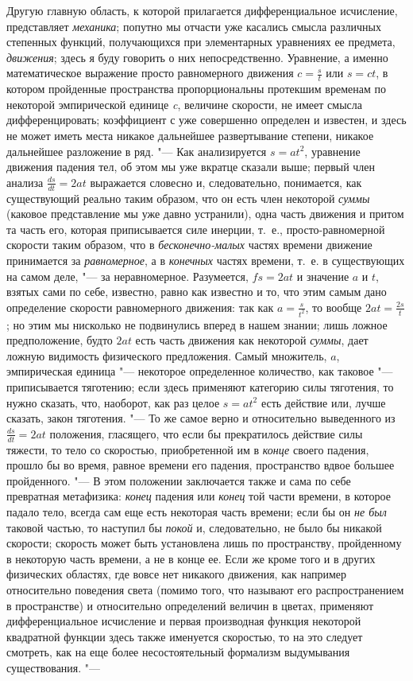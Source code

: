 Другую главную область, к которой прилагается дифференциальное исчисление,
представляет {\em механика}; попутно мы отчасти уже
касались смысла различных степенных функций, получающихся при элементарных
уравнениях ее предмета, {\em движения}; здесь я буду
говорить о них непосредственно. Уравнение, а именно математическое
выражение просто равномерного движения $c=\frac s t$ или $s=ct$,
в котором пройденные пространства пропорциональны протекшим временам по
некоторой эмпирической единице {\em c}, величине
скорости, не имеет смысла дифференцировать; коэффициент с уже совершенно
определен и известен, и здесь не может иметь места никакое дальнейшее
развертывание степени, никакое дальнейшее разложение в ряд. "--- Как
анализируется $s=at^2$, уравнение движения падения тел, об этом мы уже
вкратце сказали выше; первый член анализа
$\frac{ds}{dt}=2at$ выражается словесно и,
следовательно, понимается, как существующий реально таким образом, что он
есть член некоторой {\em суммы} (каковое представление
мы уже давно устранили), одна часть движения и притом та часть его, которая
приписывается силе инерции, т.~е., просто-равномерной скорости таким
образом, что в {\em бесконечно-малых} частях времени
движение принимается за {\em равномерное}, а в
{\em конечных} частях времени, т.~е. в существующих на
самом деле, "--- за неравномерное. Разумеется, $fs=2at$ и
значение $a$ и $t$, взятых
сами по себе, известно, равно как известно и то, что этим самым дано
определение скорости равномерного движения: так как $a=\frac s{t^2}$, то
вообще $2at=\frac{2s} t$; но этим мы нисколько не подвинулись
вперед в нашем знании; лишь ложное предположение, будто $2at$
есть часть движения как некоторой {\em суммы}, дает
ложную видимость физического предложения. Самый множитель,
$a$, эмпирическая единица "--- некоторое определенное
количество, как таковое "--- приписывается тяготению; если здесь применяют
категорию силы тяготения, то нужно сказать, что, наоборот, как раз целое
$s=at^2$ есть действие или, лучше сказать, закон тяготения. "--- То же самое
верно и относительно выведенного из
$\frac{ds}{dt}=2at$ положения, гласящего, что
если бы прекратилось действие силы тяжести, то тело со скоростью,
приобретенной им в {\em конце} своего падения, прошло
бы во время, равное времени его падения, пространство вдвое большее
пройденного. "--- В этом положении заключается также и сама по себе превратная
метафизика: {\em конец} падения или
{\em конец} той части времени, в которое падало тело,
всегда сам еще есть некоторая часть времени; если бы он
{\em не был} таковой частью, то наступил бы
{\em покой} и, следовательно, не было бы никакой
скорости; скорость может быть установлена лишь по пространству, пройденному
в некоторую часть времени, а не в конце ее. Если же кроме того и в других
физических областях, где вовсе нет никакого движения, как например
относительно поведения света (помимо того, что называют его
распространением в пространстве) и относительно определений величин в
цветах, применяют дифференциальное исчисление и первая производная функция
некоторой квадратной функции здесь также именуется скоростью, то на это
следует смотреть, как на еще более несостоятельный формализм выдумывания
существования. "---

